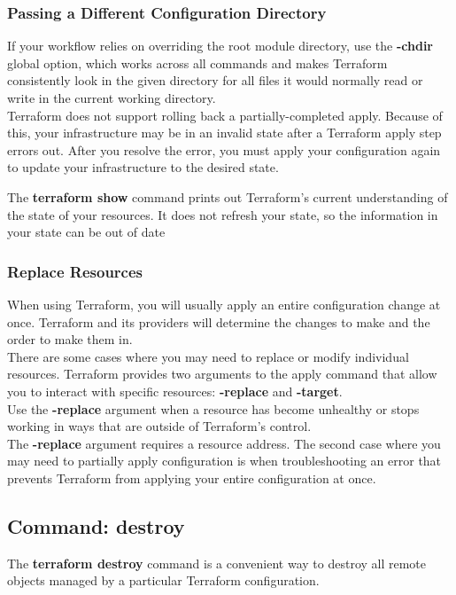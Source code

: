 \documentclass[12pt, letterpaper, twoside]{article}
\begin{document}
\subsubsection{Passing a Different Configuration Directory}
If your workflow relies on overriding the root module directory, use the \textbf{-chdir} global 
option, which works across all commands and makes Terraform consistently look in the given 
directory for all files it would normally read or write in the current working directory.\\

Terraform does not support rolling back a partially-completed apply. 
Because of this, your infrastructure may be in an invalid state after a Terraform apply step errors out. 
After you resolve the error, you must apply your configuration again to update 
your infrastructure to the desired state.

The \textbf{terraform show} command prints out Terraform's current understanding of 
the state of your resources. 
It does not refresh your state, so the information in your state can be out of date

\subsubsection{Replace Resources}
When using Terraform, you will usually apply an entire configuration change at once. 
Terraform and its providers will determine the changes to make and the order to make them in.\\
There are some cases where you may need to replace or modify individual resources. 
Terraform provides two arguments to the apply command that allow you to interact 
with specific resources: \textbf{-replace} and \textbf{-target}.\\

Use the \textbf{-replace} argument when a resource has become unhealthy 
or stops working in ways that are outside of Terraform's control.\\
The \textbf{-replace} argument requires a resource address.
The second case where you may need to partially apply configuration is 
when troubleshooting an error that prevents Terraform from applying your entire configuration 
at once.

\subsection{Command: destroy}
The \textbf{terraform destroy} command is a convenient way to destroy all
remote objects managed by a particular Terraform configuration.\\
\end{document}
